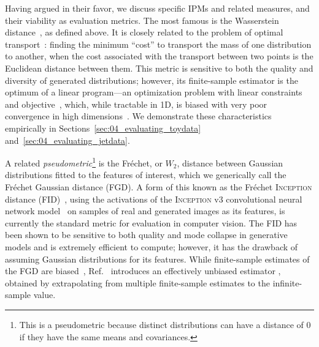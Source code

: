 Having argued in their favor, we discuss specific IPMs and related measures, and their viability as evaluation metrics.
The most famous is the Wasserstein distance~\cite{wasserstein_original,villani_ot}, as defined above.
It is closely related to the problem of optimal transport~\cite{villani_ot}: finding the minimum ``cost'' to transport the mass of one distribution to another, when the cost associated with the transport between two points is the Euclidean distance between them.
This metric is sensitive to both the quality and diversity of generated distributions; however, its finite-sample estimator is the optimum of a linear program---an optimization problem with linear constraints and objective~\cite{vanderbei2013linear}, which, while tractable in 1D, is biased with very poor convergence in high dimensions~\cite{ramdas_wasserstein}.
We demonstrate these characteristics empirically in Sections~\ref{sec:04_evaluating_toydata} and~\ref{sec:04_evaluating_jetdata}.

A related \textit{pseudometric}\footnote{This is a pseudometric because distinct distributions can have a distance of 0 if they have the same means and covariances.} is the Fr\'echet, or $W_2$, distance between Gaussian distributions fitted to the features of interest, which we generically call the Fr\'echet Gaussian distance (FGD).
A form of this known as the Fr\'echet \textsc{Inception} distance (FID)~\cite{TTUR}, using the activations of the \textsc{Inception} v3 convolutional neural network model~\cite{inception_v3} on samples of real and generated images as its features, is currently the standard metric for evaluation in computer vision.
The FID has been shown to be sensitive to both quality and mode collapse in generative models and is extremely efficient to compute; however, it has the drawback of assuming Gaussian distributions for its features.
While finite-sample estimates of the FGD are biased~\cite{binkowski_demystifying}, Ref.~\cite{chong_unbiasedfid} introduces an effectively unbiased estimator \fgdinf, obtained by extrapolating from multiple finite-sample estimates to the infinite-sample value.

